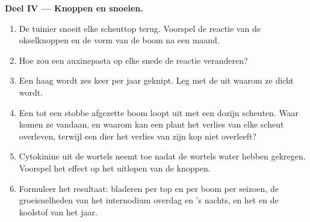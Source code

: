 \begin{problem}
\medskip
\noindent\textbf{Deel IV --- Knoppen en snoeien.}
\begin{enumerate}[resume]
  \item De tuinier snoeit elke scheuttop terug. Voorspel de reactie van de
        okselknoppen en de vorm van de boom na een maand.
  \item Hoe zou een auxinepasta op elke snede de reactie veranderen?
  \item Een haag wordt zes keer per jaar geknipt. Leg met de  uit waarom ze dicht wordt.
  \item Een tot een stobbe afgezette boom loopt uit met een dozijn scheuten.
        Waar komen ze vandaan, en waarom kan een plant het verlies van elke
        scheut overleven, terwijl een dier het verlies van zijn kop niet
        overleeft?
  \item Cytokinine uit de wortels neemt toe nadat de wortels water hebben
        gekregen. Voorspel het effect op het uitlopen van de knoppen.
  \item Formuleer het resultaat: bladeren per top en per boom per seizoen,
        de groeisnelheden van het internodium overdag en 's nachts, en het
         en de koolstof van het jaar.
\end{enumerate}
\end{problem}
